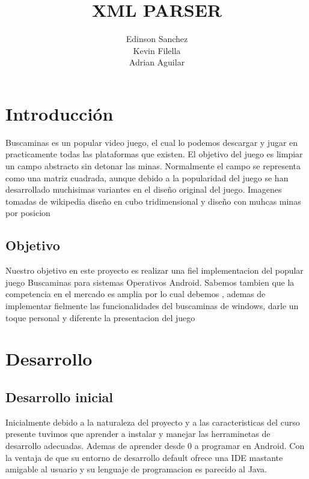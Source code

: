 \documentclass[11pt]{article} %
\title{XML PARSER}
\author{Edinson Sanchez\\Kevin Filella\\Adrian Aguilar}
\begin{document}
\maketitle



\newpage
\tableofcontents
\newpage

\section{Introducción}
Buscaminas es un popular video juego, el cual lo podemos descargar y jugar en practicamente todas las plataformas que existen.
El objetivo del juego es limpiar un campo abstracto sin detonar las minas. Normalmente el campo se representa como una matriz cuadrada, aunque debido a la popularidad del juego se han desarrollado
muchisimas variantes en el diseño original del juego.
Imagenes tomadas de wikipedia
diseño en cubo tridimensional y diseño con muhcas minas por posicion


\subsection{Objetivo}
Nuestro objetivo en este proyecto es realizar una fiel implementacion del popular juego Buscaminas para sistemas Operativos Android.
Sabemos tambien que la competencia en el mercado es amplia por lo cual debemos , ademas de implementar fielmente las funcionalidades del buscaminas de windows, darle un toque personal y diferente  la presentacion del juego

\section{Desarrollo}
\subsection{Desarrollo inicial}
Inicialmente debido  a la naturaleza del proyecto y a las caracteristicas del curso presente tuvimos que aprender a instalar y manejar las herraminetas de desarrollo adecuadas. Ademas de aprender desde 0 a programar en Android. Con la ventaja de que su entorno de desarrollo default ofrece una IDE mastante amigable al usuario y su lenguaje de programacion es parecido al Java. 
\end{document}

